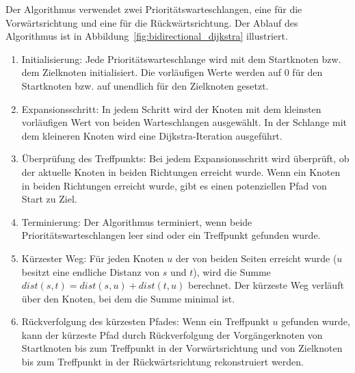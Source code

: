 Der Algorithmus verwendet zwei Prioritätswarteschlangen, eine für die Vorwärtsrichtung und eine für
die Rückwärtsrichtung. Der Ablauf des Algorithmus ist in Abbildung~\ref{fig:bidirectional_dijkstra}
illustriert.

\begin{enumerate}
    \item Initialisierung: Jede Prioritätswarteschlange wird mit dem Startknoten bzw. dem Zielknoten
          initialisiert. Die vorläufigen Werte werden auf 0 für den Startknoten bzw. auf unendlich
          für den Zielknoten gesetzt.

    \item Expansionsschritt: In jedem Schritt wird der Knoten mit dem kleinsten vorläufigen Wert von
          beiden Warteschlangen ausgewählt. In der Schlange mit dem kleineren Knoten wird eine
          Dijkstra-Iteration ausgeführt.

    \item Überprüfung des Treffpunkts: Bei jedem Expansionsschritt wird überprüft, ob der aktuelle
          Knoten in beiden Richtungen erreicht wurde. Wenn ein Knoten in beiden Richtungen erreicht
          wurde, gibt es einen potenziellen Pfad von Start zu Ziel.

    \item Terminierung: Der Algorithmus terminiert, wenn beide Prioritätswarteschlangen
          leer sind oder ein Treffpunkt gefunden wurde.

    \item Kürzester Weg: Für jeden Knoten $u$ der von beiden Seiten erreicht wurde ($u$ besitzt eine
          endliche Distanz von $s$ und $t$), wird die Summe $dist(s,t) = dist(s,u) + dist(t,u)$
          berechnet. Der kürzeste Weg verläuft über den Knoten, bei dem die Summe minimal ist.

    \item Rückverfolgung des kürzesten Pfades: Wenn ein Treffpunkt $u$ gefunden wurde, kann der
          kürzeste Pfad durch Rückverfolgung der Vorgängerknoten von Startknoten bis zum Treffpunkt
          in der Vorwärtsrichtung und von Zielknoten bis zum Treffpunkt in der Rückwärtsrichtung
          rekonstruiert werden.
\end{enumerate}

